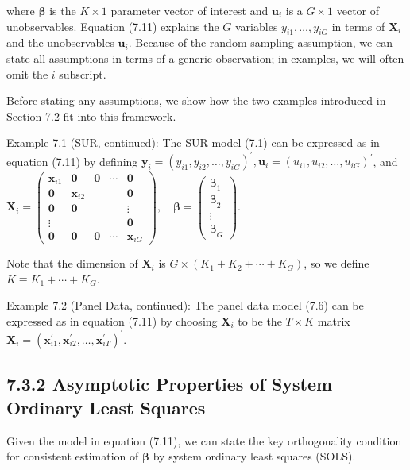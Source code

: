 \documentclass[10pt]{article}
\begin{document}
where $\boldsymbol{\beta}$ is the $K \times 1$ parameter vector of interest and $\mathbf{u}_{i}$ is a $G \times 1$ vector of unobservables. Equation (7.11) explains the $G$ variables $y_{i 1}, \ldots, y_{i G}$ in terms of $\mathbf{X}_{i}$ and the unobservables $\mathbf{u}_{i}$. Because of the random sampling assumption, we can state all assumptions in terms of a generic observation; in examples, we will often omit the $i$ subscript.

Before stating any assumptions, we show how the two examples introduced in Section 7.2 fit into this framework.

Example 7.1 (SUR, continued): The SUR model (7.1) can be expressed as in equation (7.11) by defining $\mathbf{y}_{i}=\left(y_{i 1}, y_{i 2}, \ldots, y_{i G}\right)^{\prime}, \mathbf{u}_{i}=\left(u_{i 1}, u_{i 2}, \ldots, u_{i G}\right)^{\prime}$, and\\
$\mathbf{X}_{i}=\left(\begin{array}{ccccc}\mathbf{x}_{i 1} & \mathbf{0} & \mathbf{0} & \cdots & \mathbf{0} \\ \mathbf{0} & \mathbf{x}_{i 2} & & & \mathbf{0} \\ \mathbf{0} & \mathbf{0} & & & \vdots \\ \vdots & & & & \mathbf{0} \\ \mathbf{0} & \mathbf{0} & \mathbf{0} & \cdots & \mathbf{x}_{i G}\end{array}\right), \quad \boldsymbol{\beta}=\left(\begin{array}{c}\boldsymbol{\beta}_{1} \\ \boldsymbol{\beta}_{2} \\ \vdots \\ \boldsymbol{\beta}_{G}\end{array}\right)$.

Note that the dimension of $\mathbf{X}_{i}$ is $G \times\left(K_{1}+K_{2}+\cdots+K_{G}\right)$, so we define $K \equiv K_{1}+\cdots+K_{G}$.

Example 7.2 (Panel Data, continued): The panel data model (7.6) can be expressed as in equation (7.11) by choosing $\mathbf{X}_{i}$ to be the $T \times K$ matrix $\mathbf{X}_{i}=\left(\mathbf{x}_{i 1}^{\prime}, \mathbf{x}_{i 2}^{\prime}, \ldots, \mathbf{x}_{i T}^{\prime}\right)^{\prime}$.

\subsection*{7.3.2 Asymptotic Properties of System Ordinary Least Squares}
Given the model in equation (7.11), we can state the key orthogonality condition for consistent estimation of $\boldsymbol{\beta}$ by system ordinary least squares (SOLS).
\end{document}
